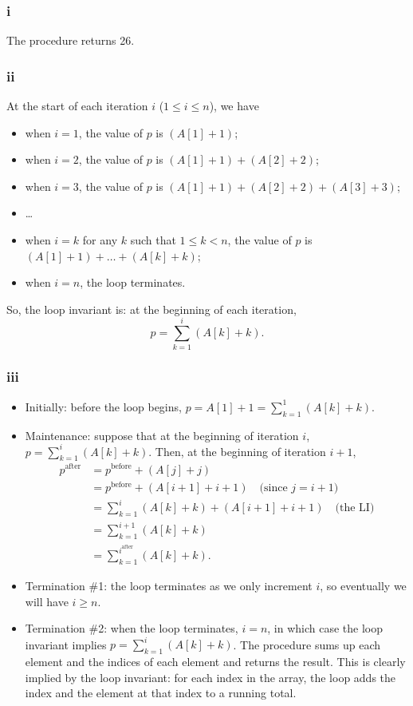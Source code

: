 \documentclass[11pt, letterpaper, titlepage]{article}
\begin{document}
\subsubsection*{i}
The procedure returns 26. 

\subsubsection*{ii}
At the start of each iteration $i$ ($1 \leq i \leq n$), we have 
\begin{itemize}
    \item when $i = 1$, the value of $p$ is $(A[1] + 1)$;
    \item when $i = 2$, the value of $p$ is $(A[1] + 1) + (A[2] + 2)$;
    \item when $i = 3$, the value of $p$ is $(A[1] + 1) + (A[2] + 2) + (A[3] + 3)$;
    \item \ldots
    \item when $i = k$ for any $k$ such that $1 \leq k < n$, the value of $p$ is $(A[1] + 1) + \ldots + (A[k] + k)$;
    \item when $i = n$, the loop terminates.
\end{itemize}
So, the loop invariant is: at the beginning of each iteration,
\begin{equation}
    p = \sum_{k = 1}^{i} (A[k] + k).
\end{equation}

\subsubsection*{iii}
\begin{itemize}
    \item Initially: before the loop begins, $p = A[1] + 1 = \sum_{k = 1}^{1} (A[k] + k).$
    \item Maintenance: suppose that at the beginning of iteration $i$, $p = \sum_{k = 1}^{i} (A[k] + k)$. Then, at the beginning of iteration $i + 1$,
    \begin{align}
        p^\text{after} &= p^\text{before} + (A[j] + j) \\
        &= p^\text{before} + (A[i+1] + i+1) \quad \text{(since $j = i + 1$)} \\
        &= \sum_{k = 1}^{i} (A[k] + k) + (A[i+1] + i+1) \quad \text{(the LI)} \\
        &= \sum_{k = 1}^{i + 1} (A[k] + k) \\
        &= \sum_{k = 1}^{i^\text{after}} (A[k] + k).
    \end{align}
    \item Termination \#1: the loop terminates as we only increment $i$, so eventually we will have $i \geq n$.
    \item Termination \#2: when the loop terminates, $i = n$, in which case the loop invariant implies $p = \sum_{k = 1}^{i} (A[k] + k)$. The procedure sums up each element and the indices of each element and returns the result. This is clearly implied by the loop invariant: for each index in the array, the loop adds the index and the element at that index to a running total.
\end{itemize}
\end{document}
